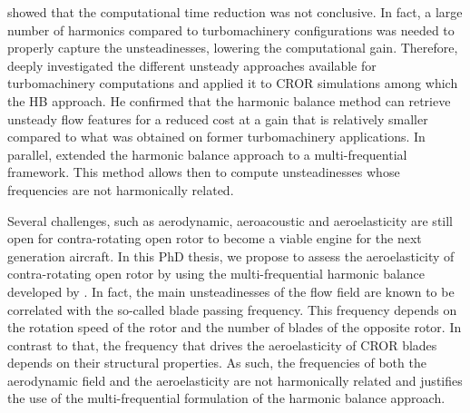 showed that the computational time reduction
was not conclusive. In fact, a large number of 
harmonics compared to turbomachinery configurations
was needed to properly capture the unsteadinesses, lowering
the computational gain.
Therefore, \citet{ThesisFrancois} deeply
investigated the different unsteady approaches available 
for turbomachinery computations and applied it to CROR simulations
among which the HB approach. 
He confirmed that
the harmonic balance method can retrieve unsteady
flow features for a reduced cost at a gain that
is relatively smaller compared to what was
obtained on former turbomachinery applications.
In parallel, \citet{ThesisGuedeney} extended the harmonic
balance approach to a multi-frequential framework. 
This method allows then to compute unsteadinesses whose frequencies
are not harmonically related.

Several challenges, such as aerodynamic,
aeroacoustic and aeroelasticity are still open 
for contra-rotating open rotor
to become a viable engine for the next generation aircraft.
In this PhD thesis, we propose to assess the aeroelasticity of 
contra-rotating open rotor by using the multi-frequential
harmonic balance developed by \citet{ThesisGuedeney}.
In fact, the main unsteadinesses of the flow field
are known to be correlated with the so-called
blade passing frequency. This frequency depends on the
rotation speed of the rotor and the number of blades
of the opposite rotor. In contrast to that, the 
frequency that drives the aeroelasticity of CROR
blades depends on their structural properties.
As such, the frequencies of both the aerodynamic
field and the aeroelasticity are not harmonically
related and justifies the use of the multi-frequential
formulation of the harmonic balance approach.


